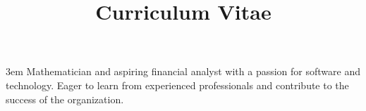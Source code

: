 \documentclass[a4paper,skipsamekey,11pt,english]{curve}
\title{Curriculum Vitae}
\begin{document}
\emergencystretch 3em
\makeheaders[c]
Mathematician and aspiring financial analyst with a passion for software and technology. Eager to learn from experienced professionals and contribute to the success of the organization.

%


% 
\end{document}
